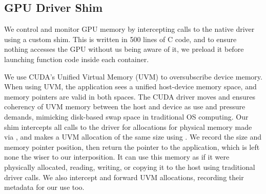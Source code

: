 


\subsection{GPU Driver Shim}
\label{sec:shim-impl}

We control and monitor GPU memory by intercepting calls to the native driver using a custom shim.
This is written in 500 lines of C code, and to ensure nothing accesses the GPU without us being aware of it, we preload it before launching function code inside each container.

We use CUDA's Unified Virtual Memory (UVM) to oversubscribe device memory.
When using UVM, the application sees a unified host-device memory space, and memory pointers are valid in both spaces.
The CUDA driver moves and ensures coherency of UVM memory between the host and device as use and pressure demands, mimicking disk-based swap space in traditional OS computing.
Our shim intercepts all calls to the driver for allocations for physical memory made via , and makes a UVM allocation of the same size using .
We record the size and memory pointer position, then return the pointer to the application, which is left none the wiser to our interposition.
It can use this memory as if it were physically allocated, reading, writing, or copying it to the host using traditional driver calls.
We also intercept and forward UVM allocations, recording their metadata for our use too.


